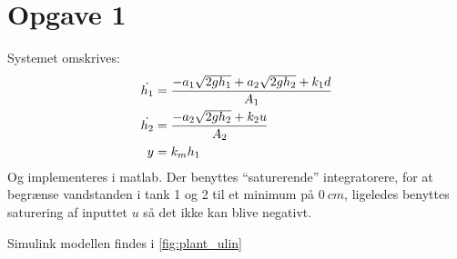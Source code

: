 \section{Opgave 1}
Systemet omskrives:
\begin{align*}
\dot{h_1} &= \frac{-a_1\sqrt{2gh_1} + a_2\sqrt{2gh_2} + k_1d}{A_1}\\
\dot{h_2} &= \frac{-a_2\sqrt{2gh_2} + k_2u}{A_2}\\
y &= k_mh_1\\
\end{align*}
Og implementeres i matlab. Der benyttes ``saturerende'' integratorere, for at
begrænse vandstanden i tank 1 og 2 til et minimum på $0~cm$, ligeledes benyttes saturering af
inputtet $u$ så det ikke kan blive negativt.

Simulink modellen findes i \ref{fig:plant_ulin}


